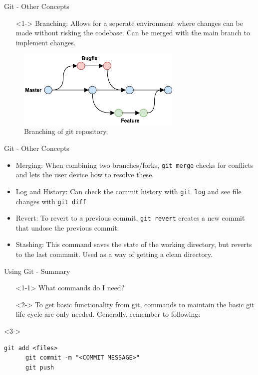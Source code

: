 \documentclass{beamer}
\begin{document}
\begin{frame}{Git - Other Concepts}
  \begin{itemize}
    \item[] <1-> Branching: Allows for a seperate environment where changes can be made without risking the codebase. Can be merged with the main branch to implement changes.
  \end{itemize}
  \begin{figure}
    \begin{center}
      \includegraphics[width=0.7\textwidth]{images/branching.png}
    \end{center}
    \caption{Branching of git repository.}\label{fig:branching}
  \end{figure}
  
\end{frame}

\begin{frame}{Git - Other Concepts}
  \begin{itemize}
    \item<1-> Merging: When combining two branches/forks, \lstinline{git merge} checks for conflicts and lets the user device how to resolve these. 
    \item<2-> Log and History: Can check the commit history with \lstinline{git log} and see file changes with \lstinline{git diff}
    \item <3-> Revert: To revert to a previous commit, \lstinline{git revert} creates a new commit that undose the previous commit.
      \item<4-> Stashing: This command saves the state of the working directory, but reverts to the last commmit. Used as a way of getting a clean directory. 
  \end{itemize}
\end{frame}

\begin{frame}[fragile]{Using Git - Summary}
  \begin{itemize}
    \item[]<1-1> What commands do I need?
    \item[]<2-> To get basic functionality from git, commands to maintain the basic git life cycle are only needed. Generally, remember to following:

  \end{itemize}
  \begin{onlyenv}<3->
    \begin{lstlisting}[frame=single]
      git add <files>
      git commit -m "<COMMIT MESSAGE>"
      git push
    \end{lstlisting}
  \end{onlyenv}
\end{frame}
\end{document}
